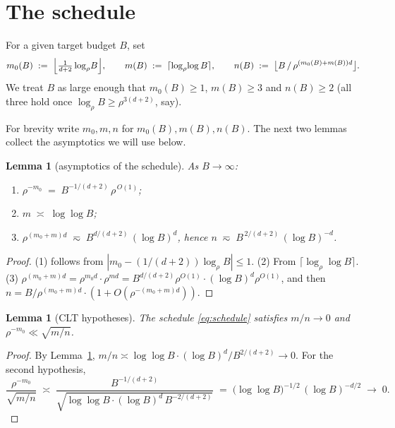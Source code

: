 \documentclass[11pt]{article}
\theoremstyle{plain}
\newtheorem{lemma}[theorem]{Lemma}
\theoremstyle{definition}
\begin{document}
\section{The schedule}\label{sec:schedule}

For a given target budget $B$, set
\begin{equation}\label{eq:schedule}
  m_0(B) \;:=\; \Bigl\lfloor \tfrac{1}{d+2}\log_\rho\!B\Bigr\rfloor,
  \qquad
  m(B)   \;:=\; \lceil \log_\rho\!\log B\rceil,
  \qquad
  n(B)   \;:=\; \bigl\lfloor B \,/\, \rho^{(m_0(B)+m(B))d}\bigr\rfloor.
\end{equation}
We treat $B$ as large enough that $m_0(B) \ge 1$, $m(B) \ge 3$ and
$n(B) \ge 2$ (all three hold once $\log_\rho B \ge \rho^{3(d+2)}$, say).

For brevity write $m_0, m, n$ for $m_0(B), m(B), n(B)$. The next two
lemmas collect the asymptotics we will use below.

\begin{lemma}[asymptotics of the schedule]\label{lem:asymp}
As $B\to\infty$:
\begin{enumerate}
  \item $\rho^{-m_0} \;=\; B^{-1/(d+2)}\,\rho^{\,O(1)}$;
  \item $m \;\asymp\; \log\log B$;
  \item $\rho^{(m_0+m)d} \;\eqsim\; B^{d/(d+2)}\,(\log B)^{d}$,
        hence $n \;\eqsim\; B^{\,2/(d+2)}\,(\log B)^{-d}$.
\end{enumerate}
\end{lemma}

\begin{proof}
(1) follows from $|m_0 - (1/(d+2))\log_\rho B| \le 1$.
(2) From $\lceil\log_\rho\log B\rceil$.
(3) $\rho^{(m_0+m)d} = \rho^{m_0 d}\cdot\rho^{m d}
   = B^{d/(d+2)}\rho^{O(1)}\cdot(\log B)^{d}\rho^{O(1)}$, and then
   $n = B/\rho^{(m_0+m)d}\cdot(1+O(\rho^{-(m_0+m)d}))$.
\end{proof}

\begin{lemma}[CLT hypotheses]\label{lem:CLT-hyp}
The schedule \eqref{eq:schedule} satisfies
$m/n \to 0$ and $\rho^{-m_0} \ll \sqrt{m/n}$.
\end{lemma}

\begin{proof}
By Lemma~\ref{lem:asymp},
$m/n \asymp \log\log B\cdot(\log B)^{d}/B^{2/(d+2)} \to 0$. For the
second hypothesis,
\[
  \frac{\rho^{-m_0}}{\sqrt{m/n}}
  \;\asymp\;
  \frac{B^{-1/(d+2)}}{\sqrt{\log\log B\cdot(\log B)^{d}\,B^{-2/(d+2)}}}
  \;=\;
  \bigl(\log\log B\bigr)^{-1/2}\,(\log B)^{-d/2}
  \;\to\; 0.
\]
\end{proof}
\end{document}
